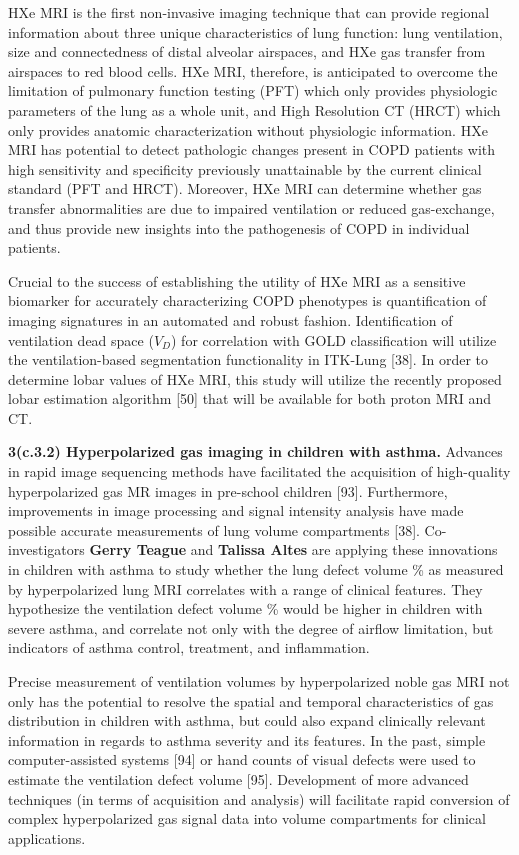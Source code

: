 \documentclass[11pt,]{article}
\begin{document}
HXe MRI is the first non-invasive imaging technique that can provide
regional information about three unique characteristics of lung
function: lung ventilation, size and connectedness of distal alveolar
airspaces, and HXe gas transfer from airspaces to red blood cells. HXe
MRI, therefore, is anticipated to overcome the limitation of pulmonary
function testing (PFT) which only provides physiologic parameters of the
lung as a whole unit, and High Resolution CT (HRCT) which only provides
anatomic characterization without physiologic information. HXe MRI has
potential to detect pathologic changes present in COPD patients with
high sensitivity and specificity previously unattainable by the current
clinical standard (PFT and HRCT). Moreover, HXe MRI can determine
whether gas transfer abnormalities are due to impaired ventilation or
reduced gas-exchange, and thus provide new insights into the
pathogenesis of COPD in individual patients.

Crucial to the success of establishing the utility of HXe MRI as a
sensitive biomarker for accurately characterizing COPD phenotypes is
quantification of imaging signatures in an automated and robust fashion.
Identification of ventilation dead space (\(V_D\)) for correlation with
GOLD classification will utilize the ventilation-based segmentation
functionality in ITK-Lung {[}38{]}. In order to determine lobar values
of HXe MRI, this study will utilize the recently proposed lobar
estimation algorithm {[}50{]} that will be available for both proton MRI
and CT.

\textbf{3(c.3.2) Hyperpolarized gas imaging in children with asthma.}
Advances in rapid image sequencing methods have facilitated the
acquisition of high-quality hyperpolarized gas MR images in pre-school
children {[}93{]}. Furthermore, improvements in image processing and
signal intensity analysis have made possible accurate measurements of
lung volume compartments {[}38{]}. Co-investigators \textbf{Gerry
Teague} and \textbf{Talissa Altes} are applying these innovations in
children with asthma to study whether the lung defect volume \% as
measured by hyperpolarized lung MRI correlates with a range of clinical
features. They hypothesize the ventilation defect volume \% would be
higher in children with severe asthma, and correlate not only with the
degree of airflow limitation, but indicators of asthma control,
treatment, and inflammation.

Precise measurement of ventilation volumes by hyperpolarized noble gas
MRI not only has the potential to resolve the spatial and temporal
characteristics of gas distribution in children with asthma, but could
also expand clinically relevant information in regards to asthma
severity and its features. In the past, simple computer-assisted systems
{[}94{]} or hand counts of visual defects were used to estimate the
ventilation defect volume {[}95{]}. Development of more advanced
techniques (in terms of acquisition and analysis) will facilitate rapid
conversion of complex hyperpolarized gas signal data into volume
compartments for clinical applications.
\end{document}

